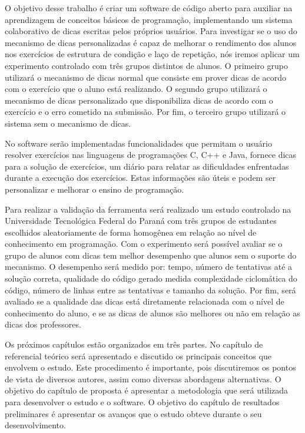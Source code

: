 O objetivo desse trabalho é criar um software de código aberto para auxiliar na aprendizagem de conceitos básicos de programação, implementando um sistema colaborativo de dicas escritas pelos próprios usuários. Para investigar se o uso do mecanismo de dicas personalizadas é capaz de melhorar o rendimento dos alunos nos exercícios de estrutura de condição e laço de repetição, nós iremos aplicar um experimento controlado com três grupos distintos de alunos. O primeiro grupo utilizará o mecanismo de dicas normal que consiste em prover dicas de acordo com o exercício que o aluno está realizando. O segundo grupo utilizará o mecanismo de dicas personalizado que disponibiliza dicas de acordo com o exercício e o erro cometido na submissão. Por fim, o terceiro grupo utilizará o sistema sem o mecanismo de dicas.

No software serão implementadas funcionalidades que permitam o usuário resolver exercícios nas linguagens de programações C, C++ e Java, fornece dicas para a solução de exercícios, um diário para relatar as dificuldades enfrentadas durante a execução dos exercícios. Estas informações são úteis e podem ser personalizar e melhorar o ensino de programação.

Para realizar a validação da ferramenta será realizado um estudo controlado na Universidade Tecnológica Federal do Paraná com três grupos de estudantes escolhidos aleatoriamente de forma homogênea em relação ao nível de conhecimento em programação. Com o experimento será possível avaliar se o grupo de alunos com dicas tem melhor desempenho que alunos sem o suporte do mecanismo. O desempenho será medido por: tempo, número de tentativas até a solução correta, qualidade do código gerado medida complexidade ciclomática do código, número de linhas entre as tentativas e tamanho da solução. Por fim, será avaliado se a qualidade das dicas está diretamente relacionada com o nível de conhecimento do aluno, e se as dicas de alunos são melhores ou não em relação as dicas dos professores.

Os próximos capítulos estão organizados em três partes. No capítulo de referencial teórico será apresentado e discutido os principais conceitos que envolvem o estudo. Este procedimento é importante, pois discutiremos os pontos de vista de diversos autores, assim como diversas abordagens alternativas. O objetivo do capítulo de proposta é apresentar a metodologia que será utilizada para desenvolver o estudo e o software. O objetivo do capítulo de resultados preliminares é apresentar os avanços que o estudo obteve durante o seu desenvolvimento.